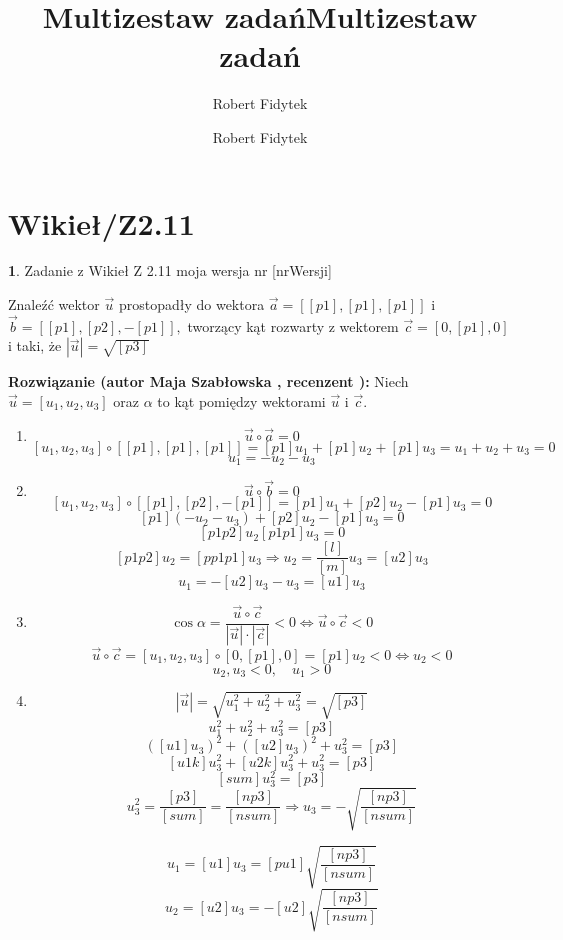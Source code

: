\documentclass[12pt, a4paper]{article}
\title{Multizestaw zadań}
\author{Robert Fidytek}
\date{}\documentclass[12pt, a4paper]{article}
\title{Multizestaw zadań}
\author{Robert Fidytek}
\date{}
\theoremstyle{definition} %
\newtheorem{zad}{}
\theoremstyle{definition} %
\newtheorem{zad}{}
\newcommand{\kategoria}[1]{\section{#1}} %
\newcommand{\zadStart}[1]{\begin{zad}#1\newline} %
\newcommand{\zadStop}{\end{zad}}   %
\newcommand{\rozwStart}[2]{\noindent \textbf{Rozwiązanie (autor #1 , recenzent #2): }\newline} %
\begin{document}
\maketitle


\kategoria{Wikieł/Z2.11}
\zadStart{Zadanie z Wikieł Z 2.11 moja wersja nr [nrWersji]}

Znaleźć wektor $\vec{u}$ prostopadły do wektora $\vec{a}=[[p1],[p1],[p1]]$ i $\vec{b}=[[p1],[p2],-[p1]],$ tworzący kąt rozwarty z wektorem $\vec{c}=[0,[p1],0]$ i taki, że $|\vec{u}|=\sqrt{[p3]}$

\zadStop

\rozwStart{Maja Szabłowska}{}
Niech $\vec{u}=[u_{1}, u_{2}, u_{3}]$ oraz $\alpha$ to kąt pomiędzy wektorami $\vec{u}$ i $\vec{c}.$
\begin{enumerate}

    \item $$\vec{u}\circ\vec{a}=0$$
$$[u_{1}, u_{2}, u_{3}]\circ[[p1],[p1],[p1]]=[p1]u_{1}+[p1]u_{2}+[p1]u_{3}=u_{1}+u_{2}+u_{3}=0$$
$$u_{1}=-u_{2}-u_{3}$$

    \item $$\vec{u}\circ\vec{b}=0$$
$$[u_{1}, u_{2}, u_{3}]\circ[[p1],[p2],-[p1]]=[p1]u_{1}+[p2]u_{2}-[p1]u_{3}=0$$
$$[p1](-u_{2}-u_{3})+[p2]u_{2}-[p1]u_{3}=0$$
$$[p1p2]u_{2}[p1p1]u_{3}=0$$
$$[p1p2]u_{2}=[pp1p1]u_{3} \Rightarrow u_{2}=\frac{[l]}{[m]}u_{3}=[u2]u_{3}$$
$$u_{1}=-[u2]u_{3}-u_{3}=[u1]u_{3}$$

    \item $$\cos\alpha=\frac{\vec{u}\circ\vec{c}}{|\vec{u}|\cdot|\vec{c}|}<0 \iff \vec{u}\circ\vec{c}<0$$
$$\vec{u}\circ\vec{c}=[u_{1}, u_{2}, u_{3}]\circ[0,[p1],0]=[p1]u_{2}<0 \iff u_{2}<0$$
$$u_{2}, u_{3}<0, \quad u_{1}>0$$

    \item $$|\vec{u}|=\sqrt{u_{1}^{2}+u_{2}^{2}+u_{3}^{2}}=\sqrt{[p3]}$$
    $$u_{1}^{2}+u_{2}^{2}+u_{3}^{2}=[p3]$$
    $$([u1]u_{3})^{2}+([u2]u_{3})^{2}+u_{3}^{2}=[p3]$$
    $$[u1k]u_{3}^{2}+[u2k]u_{3}^{2}+u_{3}^{2}=[p3]$$
    $$[sum]u_{3}^{2}=[p3]$$
    $$u_{3}^{2}=\frac{[p3]}{[sum]}=\frac{[np3]}{[nsum]} \Rightarrow u_{3}=-\sqrt{\frac{[np3]}{[nsum]}}$$

$$u_{1}=[u1]u_{3}=[pu1]\sqrt{\frac{[np3]}{[nsum]}}$$
$$u_{2}=[u2]u_{3}=-[u2]\sqrt{\frac{[np3]}{[nsum]}}$$
\end{enumerate}
\end{document}
